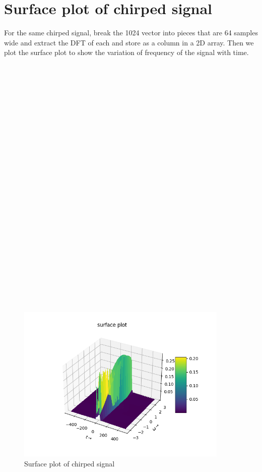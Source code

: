 \documentclass[10pt,a4paper]{article}
\begin{document}
\section{Surface plot of chirped signal}
For the same chirped signal, break the 1024 vector into pieces that are 64 samples wide and extract the DFT of each and store as a column in a 2D array. Then we plot the surface plot to show the variation of frequency of the signal with time.\\\\\\\\\\\\\\\\\\\\\\\\\\\\\\\\\\\\\\\\\\\\\\\\\\\

\begin{figure}[!tbh]

\includegraphics[width = 0.9\textwidth]{6-surface plot.png}
\caption{Surface plot of chirped signal}

\end{figure}
\end{document}
